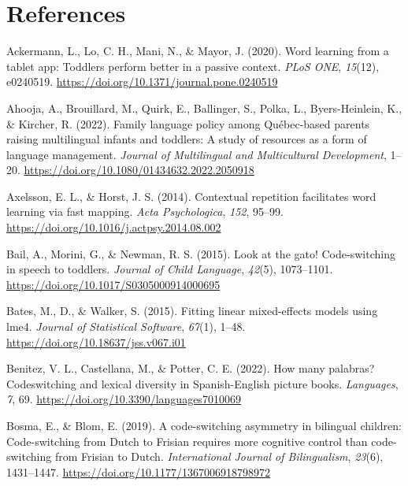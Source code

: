 \documentclass[
  man,floatsintext]{apa7}
\newlength{\cslhangindent}
\newlength{\cslentryspacingunit} %
\newenvironment{CSLReferences}[2] %
 {%
  \setlength{\parindent}{0pt}
  \ifodd #1
  \let\oldpar\par
  \def\par{\hangindent=\cslhangindent\oldpar}
  \fi
  \setlength{\parskip}{#2\cslentryspacingunit}
 }%
 {}
\begin{document}
\newpage

\hypertarget{references}{%
\section{References}\label{references}}

\begingroup
\setlength{\parindent}{-0.5in}

\hypertarget{refs}{}
\begin{CSLReferences}{1}{0}
\leavevmode{}%
Ackermann, L., Lo, C. H., Mani, N., \& Mayor, J. (2020). Word learning from a tablet app: Toddlers perform better in a passive context. \emph{PLoS ONE}, \emph{15}(12), e0240519. \url{https://doi.org/10.1371/journal.pone.0240519}

\leavevmode{}%
Ahooja, A., Brouillard, M., Quirk, E., Ballinger, S., Polka, L., Byers-Heinlein, K., \& Kircher, R. (2022). Family language policy among {Québec}-based parents raising multilingual infants and toddlers: A study of resources as a form of language management. \emph{Journal of Multilingual and Multicultural Development}, 1--20. \url{https://doi.org/10.1080/01434632.2022.2050918}

\leavevmode{}%
Axelsson, E. L., \& Horst, J. S. (2014). Contextual repetition facilitates word learning via fast mapping. \emph{Acta Psychologica}, \emph{152}, 95--99. \url{https://doi.org/10.1016/j.actpsy.2014.08.002}

\leavevmode{}%
Bail, A., Morini, G., \& Newman, R. S. (2015). Look at the gato! Code-switching in speech to toddlers. \emph{Journal of Child Language}, \emph{42}(5), 1073--1101. \url{https://doi.org/10.1017/S0305000914000695}

\leavevmode{}%
Bates, M., D., \& Walker, S. (2015). Fitting linear mixed-effects models using lme4. \emph{Journal of Statistical Software}, \emph{67}(1), 1--48. \url{https://doi.org/10.18637/jss.v067.i01}

\leavevmode{}%
Benitez, V. L., Castellana, M., \& Potter, C. E. (2022). How many palabras? Codeswitching and lexical diversity in {Spanish-English} picture books. \emph{Languages}, \emph{7}, 69. \url{https://doi.org/10.3390/languages7010069}

\leavevmode{}%
Bosma, E., \& Blom, E. (2019). A code-switching asymmetry in bilingual children: Code-switching from {Dutch} to {Frisian} requires more cognitive control than code-switching from {Frisian} to {Dutch}. \emph{International Journal of Bilingualism}, \emph{23}(6), 1431--1447. \url{https://doi.org/10.1177/1367006918798972}


\end{CSLReferences}
\end{document}
